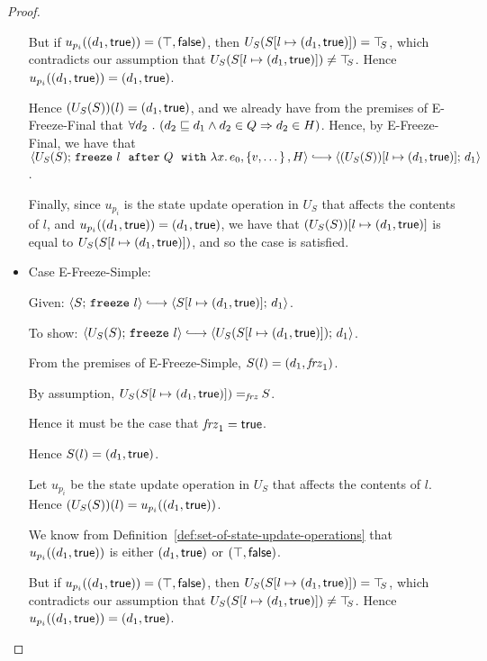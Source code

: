 \begin{proof}
\begin{itemize}
      But if $u_{p_i}((d_1, \textsf{true})) =
      (\top, \textsf{false})$, then
      $U_S(S[l \mapsto (d_1, \textsf{true})]) = \top\hspace{-0.85mm}_{S}$, which contradicts
      our assumption that $U_S(S[l \mapsto (d_1, \textsf{true})]) \neq
      \top\hspace{-0.85mm}_{S}$.  Hence $u_{p_i}((d_1, \textsf{true})) =
      (d_1, \textsf{true})$.

      Hence $(U_S(S))(l) = (d_1, \textsf{true})$, and we already
      have from the premises of {\sc E-Freeze-Final} that
      $\forall{d_2} ~.~ ( {d_2 \sqsubseteq d_1 \land d_2 \in Q}
      \Rightarrow d_2 \in H)$.  Hence, by {\sc E-Freeze-Final}, we
      have that
      $\config{U_S(S)}{\freezeafterfull{l}{Q}{\lam{x}{e_0}}{\setof{v,
            \dots}}{H}} \parstepsto
      \config{\extS{(U_S(S))}{l}{d_1}{\frozentrue}}{d_1}$.

      Finally, since $u_{p_i}$ is the state update operation in $U_S$
      that affects the contents of $l$, and
      $u_{p_i}((d_1, \textsf{true})) = (d_1, \textsf{true})$,
      we have that $(U_S(S))[l \mapsto (d_1, \textsf{true})]$ is equal to
      $U_S(S[l \mapsto (d_1, \textsf{true})])$, and so the case is
      satisfied.

    \item Case {\sc E-Freeze-Simple}:

      Given: $\config{S}{\freeze{l}} \parstepsto
      \config{\extS{S}{l}{d_1}{\frozentrue}}{d_1}$.

      To show: $\config{U_S(S)}{\freeze{l}} \parstepsto
      \config{U_S(\extS{S}{l}{d_1}{\frozentrue})}{d_1}$.

      From the premises of {\sc E-Freeze-Simple}, $S(l) =
      (d_1, \mathit{frz}_1)$.

      By assumption, $U_S(S[l \mapsto (d_1, \textsf{true})]) =_{\textit{frz}} S$.

      Hence it must be the case that $\mathit{frz}_1 = \textsf{true}$.

      Hence $S(l) = (d_1, \textsf{true})$.

      Let $u_{p_i}$ be the state update operation in $U_S$ that
      affects the contents of $l$.  Hence $(U_S(S))(l) =
      u_{p_i}((d_1, \textsf{true}))$.

      We know from Definition~\ref{def:set-of-state-update-operations}
      that $u_{p_i}((d_1, \textsf{true}))$ is either
      $(d_1, \textsf{true})$ or $(\top, \textsf{false})$.

      But if $u_{p_i}((d_1, \textsf{true})) =
      (\top, \textsf{false})$, then
      $U_S(S[l \mapsto (d_1, \textsf{true})]) = \top\hspace{-0.85mm}_{S}$, which contradicts
      our assumption that $U_S(S[l \mapsto (d_1, \textsf{true})]) \neq
      \top\hspace{-0.85mm}_{S}$.  Hence $u_{p_i}((d_1, \textsf{true})) =
      (d_1, \textsf{true})$.


\end{itemize}
\end{proof}
